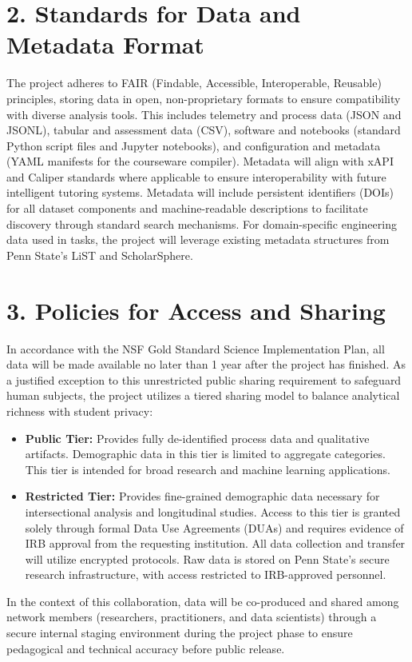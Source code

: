 \documentclass[11pt]{article}
\begin{document}
\section*{2. Standards for Data and Metadata Format}
The project adheres to FAIR (Findable, Accessible, Interoperable, Reusable) principles, storing data in open, non-proprietary formats to ensure compatibility with diverse analysis tools. This includes telemetry and process data (JSON and JSONL), tabular and assessment data (CSV), software and notebooks (standard Python script files and Jupyter notebooks), and configuration and metadata (YAML manifests for the courseware compiler).
Metadata will align with xAPI and Caliper standards where applicable to ensure interoperability with future intelligent tutoring systems.
Metadata will include persistent identifiers (DOIs) for all dataset components and machine-readable descriptions to facilitate discovery through standard search mechanisms.
For domain-specific engineering data used in tasks, the project will leverage existing metadata structures from Penn State's LiST and ScholarSphere.

\section*{3. Policies for Access and Sharing}

In accordance with the NSF Gold Standard Science Implementation Plan, all data will be made available no later than 1 year after the project has finished.
As a justified exception to this unrestricted public sharing requirement to safeguard human subjects, the project utilizes a tiered sharing model to balance analytical richness with student privacy:
\vspace{-0.3cm}
\begin{itemize}
    \item \textbf{Public Tier:} Provides fully de-identified process data and qualitative artifacts. Demographic data in this tier is limited to aggregate categories. This tier is intended for broad research and machine learning applications.\vspace{-0.3cm}
    \item \textbf{Restricted Tier:} Provides fine-grained demographic data necessary for intersectional analysis and longitudinal studies. Access to this tier is granted solely through formal Data Use Agreements (DUAs) and requires evidence of IRB approval from the requesting institution. All data collection and transfer will utilize encrypted protocols. Raw data is stored on Penn State’s secure research infrastructure, with access restricted to IRB-approved personnel.\vspace{-0.3cm}
\end{itemize}
In the context of this collaboration, data will be co-produced and shared among network members (researchers, practitioners, and data scientists) through a secure internal staging environment during the project phase to ensure pedagogical and technical accuracy before public release.
\end{document}
